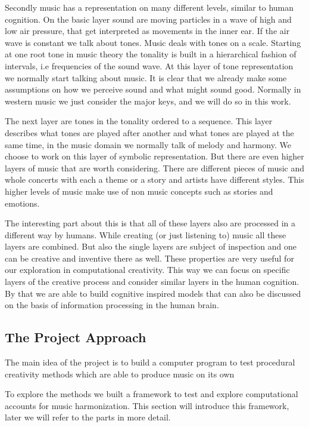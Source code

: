 Secondly music has a representation on many different levels, similar to human cognition. On the basic layer sound are moving particles in a wave of high and low air pressure, that get interpreted as movements in the inner ear. If the air wave is constant we talk about tones. Music deals with tones on a scale. Starting at one root tone in music theory the tonality is built in a hierarchical fashion of intervals, i.e frequencies of the sound wave. At this layer of tone representation we normally start talking about music. It is clear that we already make some assumptions on how we perceive sound and what might sound good. Normally in western music we just consider the major keys, and we will do so in this work. 

The next layer are tones in the tonality ordered to a sequence. This layer describes what tones are played after another and what tones are played at the same time, in the music domain we normally talk of melody and harmony. We choose to work on this layer of symbolic representation. But there are even higher layers of music that are worth considering. There are different pieces of music and whole concerts with each a theme or a story and artists have different styles. This higher levels of music make use of non music concepts such as stories and emotions. 

The interesting part about this is that all of these layers also are processed in a different way by humans. While creating (or just listening to) music all these layers are combined. But also the single layers are subject of inspection and one can be creative and inventive there as well. These properties are very useful for our exploration in computational creativity. This way we can focus on specific layers of the creative process and consider similar layers in the human cognition. By that we are able to build cognitive inspired models that can also be discussed on the basis of information processing in the human brain. 

\subsection{The Project Approach}
The main idea of the project is to build a computer program to test procedural creativity methods which are able to produce music on its own 

To explore the methods we built a framework to test and explore computational accounts for music harmonization. This section will introduce this framework, later we will refer to the parts in more detail.


